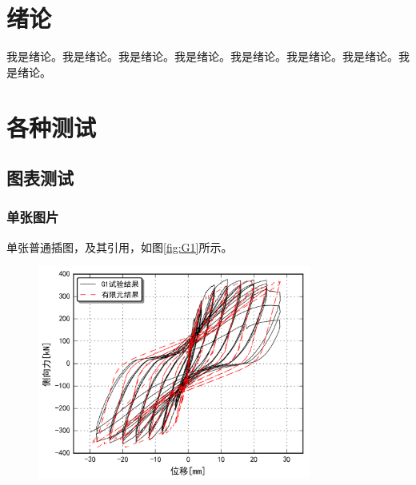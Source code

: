 \documentclass{bjtuthesis}
\begin{document}
\cover
\myclpage
\ccopyright
\myclpage
\setcounter{page}{1}
\ctitlepage
\myclpage
\thankspage
\myclpage
\cabspage
\myfanpage
\eabspage
\myfanpage
\cprepage
\myfanpage
\pagestyle{myfancy}
\tableofcontents
\chapter{绪论}
\setcounter{page}{1}
我是绪论。我是绪论。我是绪论。我是绪论。我是绪论。我是绪论。我是绪论。我是绪论。
\chapter{各种测试}
\section{图表测试}
\subsection{单张图片}
单张普通插图，及其引用，如图\ref{fig:G1}所示。

\begin{figure}[!htp]
\centering
\includegraphics[width=0.8\textwidth]{pic/G1.png}
\end{figure}
\end{document}
